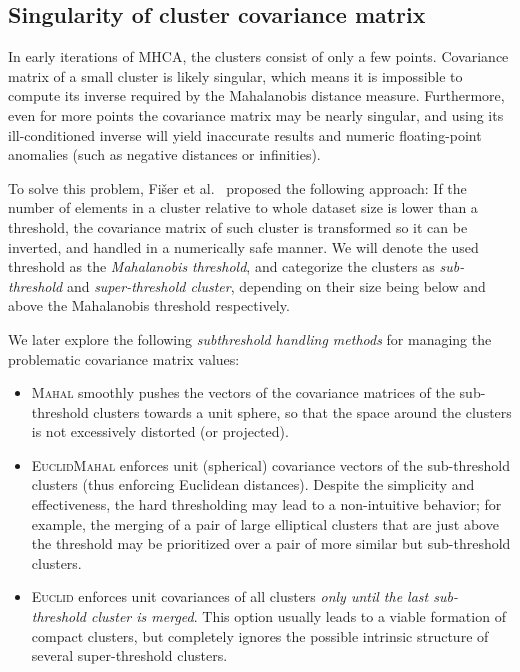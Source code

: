 \subsection{Singularity of cluster covariance matrix}\label{sec:maho-singular}

In early iterations of MHCA, the clusters consist of only a few points.
Covariance matrix of a small cluster is likely singular, which means it is impossible to compute its inverse required by the Mahalanobis distance measure.
Furthermore, even for more points the covariance matrix may be nearly singular, and using its ill-conditioned inverse will yield inaccurate results and numeric floating-point anomalies (such as negative distances or infinities).

To solve this problem, Fišer et al.~\cite{fivser2012detection} proposed the following approach:
If the number of elements in a cluster relative to whole dataset size is lower than a threshold, the covariance matrix of such cluster is transformed so it can be inverted, and handled in a numerically safe manner.
We will denote the used threshold as the \emph{Mahalanobis threshold}, and categorize the clusters as \emph{sub-threshold} and \emph{super-threshold cluster}, depending on their size being below and above the Mahalanobis threshold respectively.

We later explore the following \emph{subthreshold handling methods} for managing the problematic covariance matrix values:
\begin{itemize}
	\item \textsc{Mahal} smoothly pushes the vectors of the covariance matrices of the sub-threshold clusters towards a unit sphere, so that the space around the clusters is not excessively distorted (or projected).
	\item \textsc{EuclidMahal} enforces unit (spherical) covariance vectors of the sub-thres\-hold clusters (thus enforcing Euclidean distances).
    Despite the simplicity and effectiveness, the hard thresholding may lead to a non-intuitive behavior; for example, the merging of a pair of large elliptical clusters that are just above the threshold may be prioritized over a pair of more similar but sub-threshold clusters.
	\item \textsc{Euclid} enforces unit covariances of all clusters \emph{only until the last sub-threshold cluster is merged}.
    This option usually leads to a viable formation of compact clusters, but completely ignores the possible intrinsic structure of several super-threshold clusters.
\end{itemize}

